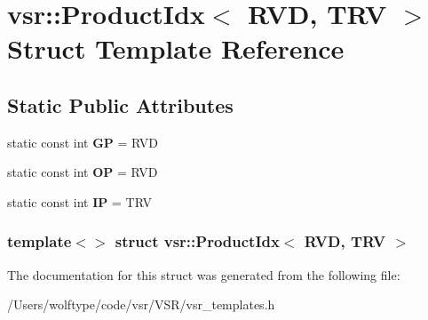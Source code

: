 \hypertarget{structvsr_1_1_product_idx_3_01_r_v_d_00_01_t_r_v_01_4}{\section{vsr\-:\-:Product\-Idx$<$ R\-V\-D, T\-R\-V $>$ Struct Template Reference}
\label{structvsr_1_1_product_idx_3_01_r_v_d_00_01_t_r_v_01_4}
}
\subsection*{Static Public Attributes}
\begin{DoxyCompactItemize}
\item 
\hypertarget{structvsr_1_1_product_idx_3_01_r_v_d_00_01_t_r_v_01_4_a0a9831d2f957e1de0e1fab068f4d1090}{static const int {\bfseries G\-P} = R\-V\-D}\label{structvsr_1_1_product_idx_3_01_r_v_d_00_01_t_r_v_01_4_a0a9831d2f957e1de0e1fab068f4d1090}

\item 
\hypertarget{structvsr_1_1_product_idx_3_01_r_v_d_00_01_t_r_v_01_4_a0b65debf0353fab49022d471722da093}{static const int {\bfseries O\-P} = R\-V\-D}\label{structvsr_1_1_product_idx_3_01_r_v_d_00_01_t_r_v_01_4_a0b65debf0353fab49022d471722da093}

\item 
\hypertarget{structvsr_1_1_product_idx_3_01_r_v_d_00_01_t_r_v_01_4_a691682499adf8a63a1b178edfcf8e440}{static const int {\bfseries I\-P} = T\-R\-V}\label{structvsr_1_1_product_idx_3_01_r_v_d_00_01_t_r_v_01_4_a691682499adf8a63a1b178edfcf8e440}

\end{DoxyCompactItemize}
\subsubsection*{template$<$$>$ struct vsr\-::\-Product\-Idx$<$ R\-V\-D, T\-R\-V $>$}



The documentation for this struct was generated from the following file\-:\begin{DoxyCompactItemize}
\item 
/\-Users/wolftype/code/vsr/\-V\-S\-R/vsr\-\_\-templates.\-h\end{DoxyCompactItemize}
